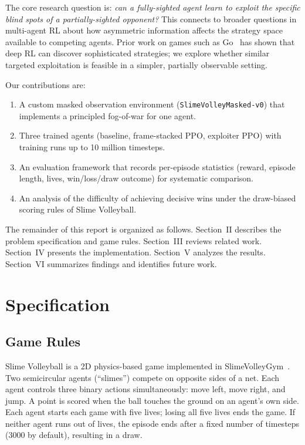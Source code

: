 \documentclass[conference]{IEEEtran}
\begin{document}
The core research question is: \textit{can a fully-sighted agent learn to exploit the specific blind spots of a partially-sighted opponent?} This connects to broader questions in multi-agent RL about how asymmetric information affects the strategy space available to competing agents. Prior work on games such as Go~\cite{silver2016mastering} has shown that deep RL can discover sophisticated strategies; we explore whether similar targeted exploitation is feasible in a simpler, partially observable setting.

Our contributions are:
\begin{enumerate}
    \item A custom masked observation environment (\texttt{SlimeVolleyMasked-v0}) that implements a principled fog-of-war for one agent.
    \item Three trained agents (baseline, frame-stacked PPO, exploiter PPO) with training runs up to 10 million timesteps.
    \item An evaluation framework that records per-episode statistics (reward, episode length, lives, win/loss/draw outcome) for systematic comparison.
    \item An analysis of the difficulty of achieving decisive wins under the draw-biased scoring rules of Slime Volleyball.
\end{enumerate}

The remainder of this report is organized as follows. Section~II describes the problem specification and game rules. Section~III reviews related work. Section~IV presents the implementation. Section~V analyzes the results. Section~VI summarizes findings and identifies future work.


\section{Specification}

\subsection{Game Rules}

Slime Volleyball is a 2D physics-based game implemented in SlimeVolleyGym~\cite{slimevolleygym}. Two semicircular agents (\enquote{slimes}) compete on opposite sides of a net. Each agent controls three binary actions simultaneously: move left, move right, and jump. A point is scored when the ball touches the ground on an agent's own side. Each agent starts each game with five lives; losing all five lives ends the game. If neither agent runs out of lives, the episode ends after a fixed number of timesteps (3000 by default), resulting in a draw.
\end{document}
